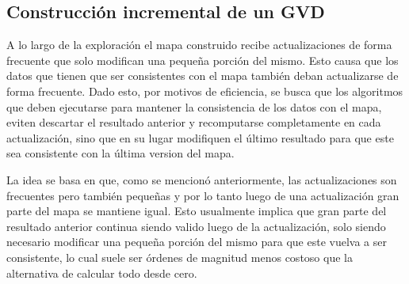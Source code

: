 \subsection{Construcción incremental de un GVD}\label{subsec:constGVDInc}



A lo largo de la exploración el mapa construido recibe actualizaciones de forma frecuente que solo modifican una pequeña porción del mismo. Esto causa que los datos que tienen que ser consistentes con el mapa también deban actualizarse de forma frecuente. Dado esto, por motivos de eficiencia, se busca que los algoritmos que deben ejecutarse para mantener la consistencia de los datos con el mapa, eviten descartar el resultado anterior y recomputarse completamente en cada actualización, sino que en su lugar modifiquen el último resultado para que este sea consistente con la última version del mapa. 

La idea se basa en que, como se mencionó anteriormente, las actualizaciones son frecuentes pero también pequeñas y por lo tanto luego de una actualización gran parte del mapa se mantiene igual. Esto usualmente implica que gran parte del resultado anterior continua siendo valido luego de la actualización, solo siendo necesario modificar una pequeña porción del mismo para que este vuelva a ser consistente, lo cual suele ser órdenes de magnitud menos costoso que la alternativa de calcular todo desde cero. 

